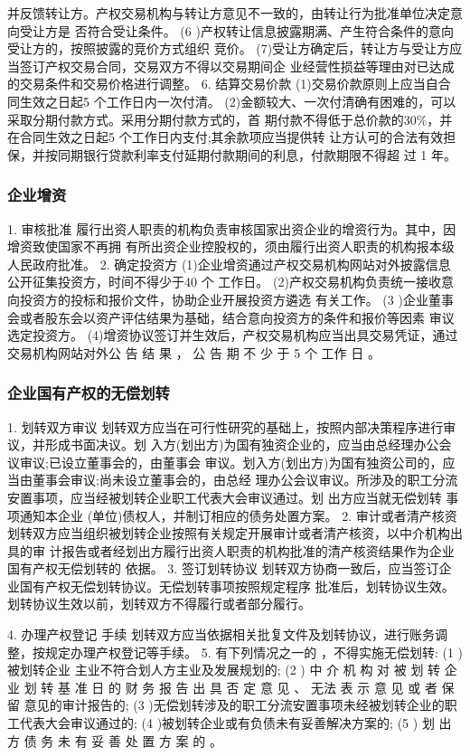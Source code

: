 \documentclass[UTF8,12pt]{ctexart}
\numberwithin{equation}{section} %
\numberwithin{figure}{section}
\numberwithin{table}{section}
\begin{document}
	
	并反馈转让方。产权交易机构与转让方意见不一致的，由转让行为批准单位决定意向受让方是
	否符合受让条件。
	(6 )产权转让信息披露期满、产生符合条件的意向受让方的，按照披露的竞价方式组织
	竞价。
	(7)受让方确定后，转让方与受让方应当签订产权交易合同，交易双方不得以交易期间企
	业经营性损益等理由对已达成的交易条件和交易价格进行调整。
	6. 结算交易价款
	(1)交易价款原则上应当自合同生效之日起5 个工作日内一次付清。
	(2)金额较大、一次付清确有困难的，可以采取分期付款方式。采用分期付款方式的，首
	期付款不得低于总价款的30\%，并在合同生效之日起5 个工作日内支付;其余款项应当提供转
	让方认可的合法有效担保，并按同期银行贷款利率支付延期付款期间的利息，付款期限不得超
	过 1 年。
	
	\subsubsection{企业增资}
	1. 审核批准
	履行出资人职责的机构负责审核国家出资企业的增资行为。其中，因增资致使国家不再拥
	有所出资企业控股权的，须由履行出资人职责的机构报本级人民政府批准。
	2. 确定投资方
	(1)企业增资通过产权交易机构网站对外披露信息公开征集投资方，时间不得少于40 个
	工作日。
	(2)产权交易机构负责统一接收意向投资方的投标和报价文件，协助企业开展投资方遴选
	有关工作。
	(3 )企业董事会或者股东会以资产评估结果为基础，结合意向投资方的条件和报价等因素
	审议选定投资方。
	(4)增资协议签订并生效后，产权交易机构应当出具交易凭证，通过交易机构网站对外公
	告 结 果 ， 公 告 期 不 少 于 5 个 工作 日 。
	
	\subsubsection{企业国有产权的无偿划转}
	1. 划转双方审议
	划转双方应当在可行性研究的基础上，按照内部决策程序进行审议，并形成书面决议。划
	入方(划出方)为国有独资企业的，应当由总经理办公会议审议;已设立董事会的，由董事会
	审议。划入方(划出方)为国有独资公司的，应当由董事会审议;尚未设立董事会的，由总经
	理办公会议审议。所涉及的职工分流安置事项，应当经被划转企业职工代表大会审议通过。划
	出方应当就无偿划转 事项通知本企业 (单位)债权人，并制订相应的债务处置方案。
	2. 审计或者清产核资
	划转双方应当组织被划转企业按照有关规定开展审计或者清产核资，以中介机构出具的审
	计报告或者经划出方履行出资人职责的机构批准的清产核资结果作为企业国有产权无偿划转的
	依据。
	3. 签订划转协议
	划转双方协商一致后，应当签订企业国有产权无偿划转协议。无偿划转事项按照规定程序
	批准后，划转协议生效。划转协议生效以前，划转双方不得履行或者部分履行。
	
	4. 办理产权登记 手续
	划转双方应当依据相关批复文件及划转协议，进行账务调整，按规定办理产权登记等手续。
	5. 有下列情况之一的 ，不得实施无偿划转:
	(1 )被划转企业 主业不符合划人方主业及发展规划的;
	(2 ) 中 介 机 构 对 被 划 转 企 业 划 转 基 准 日 的 财 务 报 告 出 具 否 定 意 见 、 无法 表 示 意 见 或 者 保 留
	意见的审计报告的;
	(3 )无偿划转涉及的职工分流安置事项未经被划转企业的职 工代表大会审议通过的;
	(4 )被划转企业或有负债未有妥善解决方案的;
	(5 ) 划 出 方 债 务 未 有 妥 善 处 置 方 案 的 。
	
\end{document}
